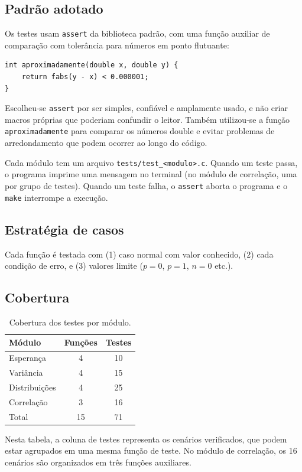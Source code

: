\documentclass[12pt,a4paper]{article}
\newcommand{\cod}[1]{\texttt{#1}}
\begin{document}
\subsection{Padrão adotado}
Os testes usam \cod{assert} da biblioteca padrão, com uma função auxiliar de
comparação com tolerância para números em ponto flutuante:
\begin{lstlisting}
int aproximadamente(double x, double y) {
    return fabs(y - x) < 0.000001;
} 
\end{lstlisting}
Escolheu-se \cod{assert} por ser simples, confiável e amplamente usado, e não criar macros próprias que poderiam confundir o leitor.
Também utilizou-se a função \cod{aproximadamente} para comparar os números double e evitar problemas de arredondamento que podem ocorrer 
ao longo do código.


Cada módulo tem um arquivo \cod{tests/test\_<modulo>.c}. Quando um teste passa, o programa imprime uma mensagem no terminal (no módulo de correlação, uma por grupo de testes). 
Quando um teste falha, o \cod{assert} aborta o programa e o \cod{make} interrompe a execução.


\subsection{Estratégia de casos}
Cada função é testada com (1) caso normal com valor conhecido, (2) cada
condição de erro, e (3) valores limite ($p = 0$, $p = 1$, $n = 0$ etc.).

\subsection{Cobertura}
\begin{table}[h]
\centering
\small
\begin{tabular}{@{}lcc@{}}
\toprule
Módulo & Funções & Testes \\
\midrule
Esperança      & 4 & 10 \\
Variância      & 4 & 15 \\
Distribuições  & 4 & 25 \\
Correlação     & 3 & 16 \\
\midrule
Total          & 15 & 71 \\
\bottomrule
\end{tabular}
\caption{Cobertura dos testes por módulo.}
\end{table}

Nesta tabela, a coluna de testes representa os cenários verificados,
que podem estar agrupados em uma mesma função de teste.
No módulo de correlação, os 16 cenários são organizados em
três funções auxiliares.
\end{document}

